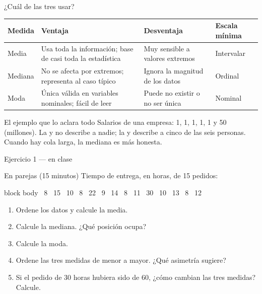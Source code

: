 \documentclass[aspectratio=169,10pt]{beamer}
\begin{document}
\begin{frame}{¿Cuál de las tres usar?}
  \scriptsize
  \begin{center}
  \begin{tabular}{@{}p{2.0cm}p{3.6cm}p{3.3cm}p{2.7cm}@{}}
    \toprule
    \textbf{Medida} & \textbf{Ventaja} & \textbf{Desventaja} &
    \textbf{Escala mínima} \\
    \midrule
    Media & Usa toda la información; base de casi toda la estadística &
      Muy sensible a valores extremos & Intervalar \\
    \addlinespace
    Mediana & No se afecta por extremos; representa al caso típico &
      Ignora la magnitud de los datos & Ordinal \\
    \addlinespace
    Moda & Única válida en variables nominales; fácil de leer &
      Puede no existir o no ser única & Nominal \\
    \bottomrule
  \end{tabular}
  \end{center}

  \vspace{0.1cm}
  \begin{alertblock}{El ejemplo que lo aclara todo}
    \scriptsize
    Salarios de una empresa: 1, 1, 1, 1, 1 y 50 (millones). La  y no describe a nadie; la  y describe a
    cinco de las seis personas. Cuando hay cola larga, la mediana es más
    honesta.
  \end{alertblock}
\end{frame}

\begin{frame}{Ejercicio 1 — en clase}
  \begin{alertblock}{En parejas (15 minutos)}
    \footnotesize
    Tiempo de entrega, en horas, de 15 pedidos:

    \vspace{0.15cm}
    \begin{beamercolorbox}[wd=0.92\textwidth,sep=0.1cm]{block body}
      \centering\scriptsize{} \ 8 \ 15 \ 10 \ 8 \ 22 \ 9 \ 14 \ 8 \ 11 \ 30 \ 10 \ 13 \ 8 \ 12
    \end{beamercolorbox}

    \vspace{0.2cm}
    \begin{enumerate}\setlength{\itemsep}{-0.05cm}
      \item Ordene los datos y calcule la media.
      \item Calcule la mediana. ¿Qué posición ocupa?
      \item Calcule la moda.
      \item Ordene las tres medidas de menor a mayor. ¿Qué asimetría sugiere?
      \item Si el pedido de 30 horas hubiera sido de 60, ¿cómo cambian las tres
            medidas? Calcule.
    \end{enumerate}
  \end{alertblock}
\end{frame}
\end{document}
